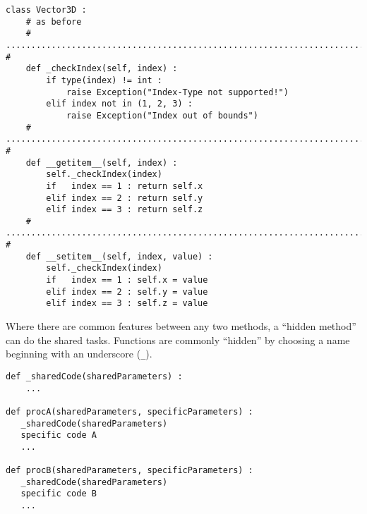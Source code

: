 \begin{frame}[fragile]
%
\begin{codebox}
\begin{verbatim}
class Vector3D :
    # as before
    # ........................................................................ #
    def _checkIndex(self, index) :
        if type(index) != int :
            raise Exception("Index-Type not supported!")
        elif index not in (1, 2, 3) :
            raise Exception("Index out of bounds")
    # ........................................................................ #    
    def __getitem__(self, index) :
        self._checkIndex(index)
        if   index == 1 : return self.x
        elif index == 2 : return self.y
        elif index == 3 : return self.z    
    # ........................................................................ #    
    def __setitem__(self, index, value) :
        self._checkIndex(index)
        if   index == 1 : self.x = value
        elif index == 2 : self.y = value
        elif index == 3 : self.z = value
\end{verbatim}
\end{codebox}
%
\end{frame}


\begin{frame}[fragile]
%
\begin{hintbox}
Where there are common features between any two methods, a \enquote{hidden method} can do the shared tasks. Functions are commonly \enquote{hidden} by choosing a name beginning with an underscore (\texttt{\_}).
\end{hintbox}
%
\begin{codebox}
\begin{verbatim}
def _sharedCode(sharedParameters) :
    ...

def procA(sharedParameters, specificParameters) :
   _sharedCode(sharedParameters)
   specific code A
   ...

def procB(sharedParameters, specificParameters) :
   _sharedCode(sharedParameters)
   specific code B
   ...
\end{verbatim}
\end{codebox}
%
\end{frame}

